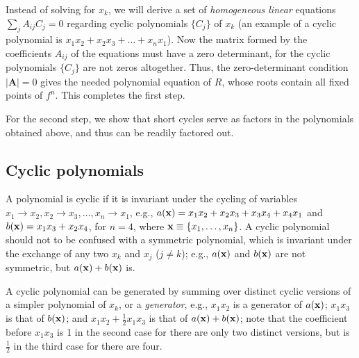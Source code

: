 \documentclass[preprint]{revtex4-1}
\begin{document}
Instead of solving  for $x_k$,
  we will derive a set of \emph{homogeneous linear} equations
  $\sum_j A_{ij} C_j = 0$
  regarding cyclic polynomials $\{C_j\}$ of $x_k$
  (an example of a cyclic polynomial is $x_1 x_2 + x_2 x_3 + \dots + x_n x_1$).
%
Now the matrix formed by the coefficients $A_{ij}$ of the equations
  must have a zero determinant,
  for the cyclic polynomials $\{C_j\}$ are not zeros altogether.
%
Thus, the zero-determinant condition $|\mathbf A| = 0$ gives
  the needed polynomial equation of $R$,
whose roots contain all fixed points of $f^n$.
This completes the first step.
%
%


For the second step,
we show
that short cycles serve as
factors in the polynomials obtained above,
and thus can be readily factored out.


\subsection{\label{sec:cyclic}Cyclic polynomials}


A polynomial is cyclic if it is invariant
  under the cycling of variables
  $x_1 \rightarrow x_2, x_2 \rightarrow x_3,
  \ldots, x_n \rightarrow x_1$,
  e.g., $a(\mathbf{x}) = x_1 x_2 + x_2 x_3 + x_3 x_4 + x_4 x_1$
  and $b(\mathbf{x}) = x_1 x_3 + x_2 x_4$,
  for $n = 4$, where $\mathbf{x} \equiv \{x_1, \ldots, x_n\}$.
A cyclic polynomial should not to be confused with a symmetric polynomial,
  which is invariant under the exchange of any two $x_k$ and $x_{j}$ ($j \ne k$);
  e.g., $a(\mathbf{x})$ and $b(\mathbf{x})$ are not symmetric,
  but $a(\mathbf{x}) + b(\mathbf{x})$ is.


A cyclic polynomial can be generated by summing over
  distinct cyclic versions of a simpler polynomial of $x_k$, or a \emph{generator},
e.g.,
$x_1 x_2$ is a generator of $a(\mathbf{x})$;
$x_1 x_3$ is that of $b(\mathbf{x})$;
and
$x_1 x_2 + \frac{1}{2} x_1 x_3$ is that of $a(\mathbf{x}) + b(\mathbf{x})$;
note that the coefficient before $x_1 x_3$
  is 1 in the second case
  for there are only two distinct versions,
  but is $\frac{1}{2}$ in the third case
  for there are four. %
\end{document}
